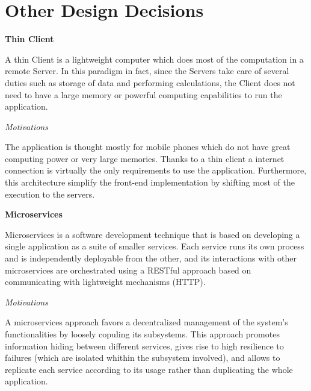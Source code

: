 \documentclass{report}
\begin{document}
\vspace{4mm}
\section{Other Design Decisions}
\begin{center}\large{\textbf{Thin Client}}\end{center}
A thin Client is a lightweight computer which does most of the computation in a remote Server. In this paradigm in fact, since the Servers take care of several duties such as storage 
of data and performing calculations, the Client does not need to have a large memory or powerful computing capabilities to run the application.
\begin{center}\large{\textit{Motivations}}\end{center} 
The application is thought mostly for mobile phones which do not have great computing power or very large memories. Thanks to a thin client a internet connection is virtually the only requirements to use the application. Furthermore, this architecture simplify the front-end implementation by shifting most of the execution to the servers.

\vspace{2mm}
\begin{center}\large{\textbf{Microservices}}\end{center}
Microservices is a software development technique that is based on developing a single application as a suite of smaller services. Each service runs its own process and is independently deployable from the other, and its interactions with other microservices are orchestrated using a RESTful approach based on communicating with lightweight mechanisms (HTTP).
\begin{center}\large{\textit{Motivations}}\end{center}
A microservices approach favors a decentralized management of the system's functionalities by loosely copuling its subsystems. This approach promotes information hiding between different services, gives rise to high resilience to failures (which are isolated whithin the subsystem involved), and allows to replicate each service according to its usage rather than duplicating the whole application. 
\end{document}
